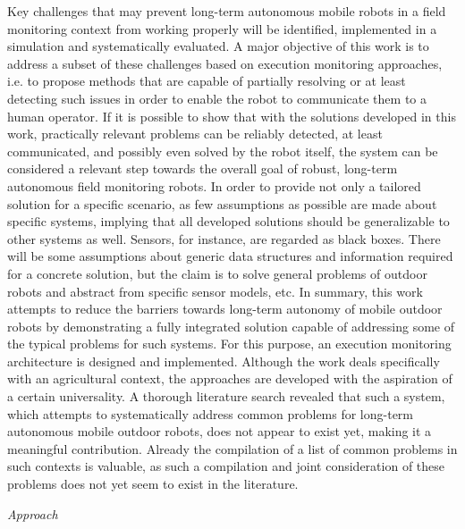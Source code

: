 \documentclass[english, master, utf8]{base/thesis_KBS}
\begin{document}
\noindent
Key challenges that may prevent long-term autonomous mobile robots in a field monitoring context from working properly will be identified, implemented 
in a simulation and systematically evaluated. A major objective of this work is to address a subset of these challenges based on execution monitoring approaches,
i.e. to propose methods that are capable of partially resolving or at least detecting such issues in order to enable the robot to communicate them to a human operator.
If it is possible to show that with the solutions developed in this work, practically relevant problems can be reliably detected, at least communicated, and possibly even solved
by the robot itself, the system can be considered a relevant step towards the overall goal of robust, long-term autonomous field monitoring robots. In order to provide not only a
tailored solution for a specific scenario, as few assumptions as possible are made about specific systems, implying that all developed solutions should be generalizable to other
systems as well. Sensors, for instance, are regarded as black boxes. There will be some assumptions about generic data structures and information required for a concrete solution,
but the claim is to solve general problems of outdoor robots and abstract from specific sensor models, etc.
 In summary, this work attempts to reduce the barriers towards long-term autonomy of mobile outdoor robots by demonstrating a fully integrated solution capable of
addressing some of the typical problems for such systems. For this purpose, an execution monitoring architecture is designed and implemented. Although the work deals specifically with
an agricultural context, the approaches are developed with the aspiration of a certain universality. A thorough literature search revealed that such a system, which attempts to
systematically address common problems for long-term autonomous mobile outdoor robots, does not appear to exist yet, making it a meaningful contribution. Already the compilation of
a list of common problems in such contexts is valuable, as such a compilation and joint consideration of these problems does not yet seem to exist in the literature.\newline

\noindent
\textit{Approach}\newline
\end{document}
